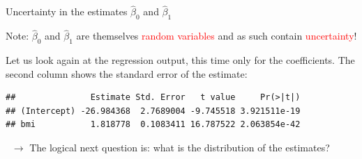 \documentclass[10pt,ignorenonframetext,]{beamer}
\newenvironment{Shaded}{\begin{snugshade}}{\end{snugshade}}
\newcommand{\KeywordTok}[1]{\textcolor[rgb]{0.13,0.29,0.53}{\textbf{#1}}}
\newcommand{\OperatorTok}[1]{\textcolor[rgb]{0.81,0.36,0.00}{\textbf{#1}}}
\newcommand{\NormalTok}[1]{#1}
\begin{document}
\begin{frame}[fragile]

\begin{block}{Uncertainty in the estimates \(\hat\beta_0\) and
\(\hat\beta_1\)}

\vspace{2mm}

Note: \(\hat\beta_0\) and \(\hat\beta_1\) are themselves
\textcolor{red}{random variables} and as such contain
\textcolor{red}{uncertainty}!

\vspace{4mm}

Let us look again at the regression output, this time only for the
coefficients. The second column shows the standard error of the
estimate: \vspace{2mm}

\small

\begin{Shaded}
\end{Shaded}

\begin{verbatim}
##               Estimate Std. Error   t value     Pr(>|t|)
## (Intercept) -26.984368  2.7689004 -9.745518 3.921511e-19
## bmi           1.818778  0.1083411 16.787522 2.063854e-42
\end{verbatim}

\normalsize
\(~\) \(\rightarrow\) The logical next question is: what is the
distribution of the estimates?

\end{block}

\end{frame}
\end{document}

